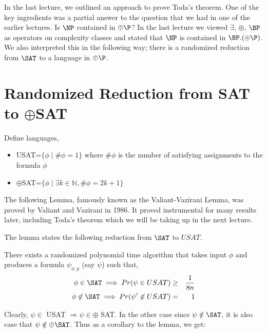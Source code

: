 \documentclass[11pt]{article}
\begin{document}


In the last lecture, we outlined an approach to prove Toda's theorem. One of the key ingredients was a partial answer to the question that we had in one of the earlier lectures. Is $\NP$ contained in $\oplus\P$? In the last lecture we viewed $\exists$, $\oplus$, $\BP$ as operators on complexity classes and stated that $\NP$ is contained in $\BP.(\oplus\P)$. 
We also interpreted this in the following way; there is a randomized reduction from $\SAT$ to a language in $\oplus\P$.

\section{Randomized Reduction from SAT to $\oplus$SAT}
Define languages, 
\begin{itemize}
\item[]USAT=$\{\phi \mid \#\phi=1\}$ \newline where $\#\phi$ is the number of satisfying assignments to the formula $\phi$
\item[]$\oplus$SAT=$\{\phi \mid \exists k \in \mathbb{N}, \#\phi=2k+1\}$
\end{itemize}

The following Lemma, famously known as the Valiant-Vazirani Lemma, was proved by Valiant and Vazirani in 1986. It proved instrumental for many results later, including Toda's theorem which we will be taking up in the next lecture.

The lemma states the following reduction from $\SAT$ to $USAT$. 

\begin{lemma}
There exists a randomized polynomial time algorithm that takes input $\phi$ and produces a formula $\psi_{\phi,y}$ (say $\psi$) such that,
\begin{eqnarray*}
\phi \in \SAT \implies Pr(\psi \in USAT) & \geq & \frac{1}{8n} \\
\phi \not\in \SAT \implies Pr (\psi' \not\in USAT) & = & 1
\end{eqnarray*}
\end{lemma}

Clearly, $\psi \in$ USAT $\Rightarrow \psi \in \oplus$ SAT. In the other case since $\psi \notin \SAT$, it is also case that $\psi \notin \oplus\SAT$. Thus as a corollary to the lemma, we get:
\end{document}
